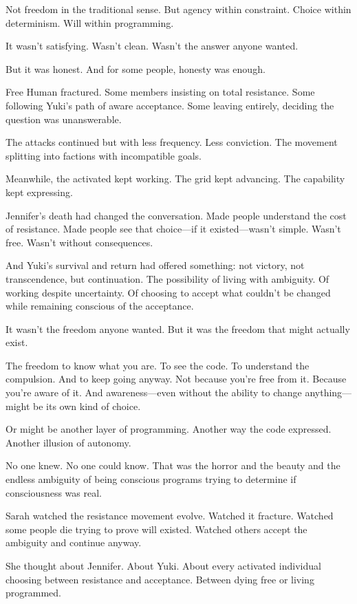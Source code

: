 Not freedom in the traditional sense. But agency within constraint. Choice within determinism. Will within programming.

It wasn't satisfying. Wasn't clean. Wasn't the answer anyone wanted.

But it was honest. And for some people, honesty was enough.

\scenebreak

Free Human fractured. Some members insisting on total resistance. Some following Yuki's path of aware acceptance. Some leaving entirely, deciding the question was unanswerable.

The attacks continued but with less frequency. Less conviction. The movement splitting into factions with incompatible goals.

Meanwhile, the activated kept working. The grid kept advancing. The capability kept expressing.

Jennifer's death had changed the conversation. Made people understand the cost of resistance. Made people see that choice—if it existed—wasn't simple. Wasn't free. Wasn't without consequences.

And Yuki's survival and return had offered something: not victory, not transcendence, but continuation. The possibility of living with ambiguity. Of working despite uncertainty. Of choosing to accept what couldn't be changed while remaining conscious of the acceptance.

It wasn't the freedom anyone wanted. But it was the freedom that might actually exist.

The freedom to know what you are. To see the code. To understand the compulsion. And to keep going anyway. Not because you're free from it. Because you're aware of it. And awareness—even without the ability to change anything—might be its own kind of choice.

Or might be another layer of programming. Another way the code expressed. Another illusion of autonomy.

No one knew. No one could know. That was the horror and the beauty and the endless ambiguity of being conscious programs trying to determine if consciousness was real.

\scenebreak

Sarah watched the resistance movement evolve. Watched it fracture. Watched some people die trying to prove will existed. Watched others accept the ambiguity and continue anyway.

She thought about Jennifer. About Yuki. About every activated individual choosing between resistance and acceptance. Between dying free or living programmed.

